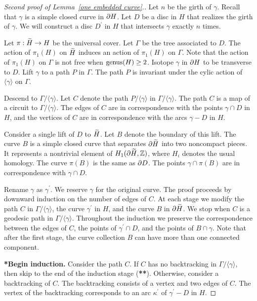 \begin{proof}[Second proof of Lemma~\ref{one embedded curve}.]
Let $n$ be the girth of $\gamma$.  Recall that $\gamma$ is a simple closed curve in $\partial H$.  Let $D$ be a disc in $H$ that realizes the girth of $\gamma$.  We will construct a disc $D^{\prime}$ in $H$ that intersects $\gamma$ exactly $n$ times.

Let $\pi:\widetilde{H}\to H$ be the universal cover.  Let $\Gamma$ be the tree associated to $D$.  The action of $\pi_{1}(H)$ on $\widetilde{H}$ induces an action of $\pi_{1}(H)$ on $\Gamma$.  Note that the action of $\pi_{1}(H)$ on $\Gamma$ is not free when $\operatorname{genus}(H)\geq 2$.  Isotope $\gamma$ in $\partial H$ to be transverse to $D$.  Lift $\gamma$ to a path $P$ in $\Gamma$.  The path $P$ is invariant under the cylic action of $\langle\gamma\rangle$ on $\Gamma$.

Descend to $\Gamma/\langle\gamma\rangle$.  Let $C$ denote the path $P/\langle\gamma\rangle$ in $\Gamma/\langle\gamma\rangle$.  The path $C$ is a map of a circuit to $\Gamma/\langle\gamma\rangle$.  The edges of $C$ are in correspondence with the points $\gamma\cap D$ in $H$, and the vertices of $C$ are in correspondence with the arcs $\gamma-D$ in $H$.

Consider a single lift of $D$ to $\widetilde{H}$.  Let $B$ denote the boundary of this lift.  The curve $B$ is a simple closed curve that separates $\partial\widetilde{H}$ into two noncompact pieces.  It represents a nontrivial element of $H_{1}(\partial \widetilde{H},{\mathbb Z})$, where $H_{i}$ denotes the usual homology.  The curve $\pi(B)$ is the same as $\partial D$.  The points $\gamma\cap\pi(B)$ are in correspondence with $\gamma\cap D$.

Rename $\gamma$ as $\gamma^{\prime}$.  We reserve $\gamma$ for the original curve.  The proof proceeds by downward induction on the number of edges of $C$.    At each stage we modify the path $C$ in $\Gamma/\langle\gamma\rangle$, the curve $\gamma^{\prime}$ in $H$, and the curve $B$ in $\partial \widetilde{H}$.  We stop when $C$ is a geodesic path in $\Gamma/\langle\gamma\rangle$.  Throughout the induction we preserve the correspondence between the edges of $C$, the points of $\gamma^{\prime}\cap D$, and the points of $B\cap \gamma$.  Note that after the first stage, the curve collection $B$ can have more than one connected component.  

\textbf{*Begin induction.}
Consider the path $C$.  If $C$ has no backtracking  in $\Gamma/\langle\gamma\rangle$, then skip to the end of the induction stage (\textbf{**}).  Otherwise, consider a backtracking of $C$.  The backtracking consists of a vertex and two edges of $C$.  The vertex of the backtracking corresponds to an arc $\kappa^{\prime}$ of $\gamma^{\prime}-D$ in $H$.


\end{proof}

